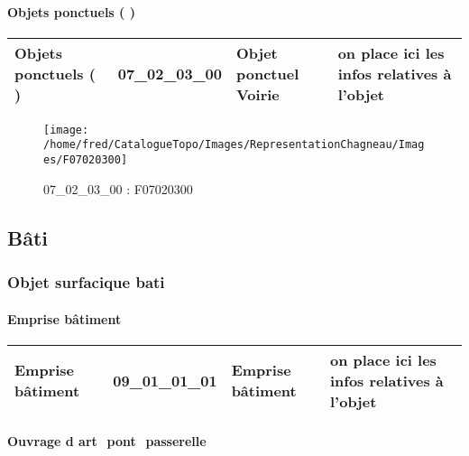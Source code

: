 \documentclass[12pt,titlepage,oneside]{book}
\begin{document}
\paragraph{Objets ponctuels ( )}
\noindent
\vspace{\baselineskip}

\renewcommand{\arraystretch}{1.2}
\begin{supertabular}{|p{10cm}|c|p{13cm}|p{12cm}|}
 Objets ponctuels ( ) & 07\_02\_03\_00 & Objet ponctuel Voirie & on place ici les infos relatives à l'objet\\
\hline
\end{supertabular}
\begin{figure}[h!]
  \hfill         %
  \begin{minipage}[t]{3cm}
    \begin{center}
      \texttt{[image: /home/fred/CatalogueTopo/Images/RepresentationChagneau/Images/F07020300]}
      \caption[F07020300]{\label{} 07\_02\_03\_00 : F07020300}
    \end{center}
  \end{minipage}
\end{figure}
\subsection{Bâti}
\subsubsection{\large Objet surfacique bati}
\paragraph{Emprise bâtiment}
\noindent
\vspace{\baselineskip}

\renewcommand{\arraystretch}{1.2}
\begin{supertabular}{|p{10cm}|c|p{13cm}|p{12cm}|}
 Emprise bâtiment & 09\_01\_01\_01 & Emprise bâtiment & on place ici les infos relatives à l'objet\\
\hline
\end{supertabular}
\begin{figure}[h!]
  \hfill         %
\end{figure}


\paragraph{Ouvrage d art  pont  passerelle}
\noindent
\vspace{\baselineskip}
\end{document}
